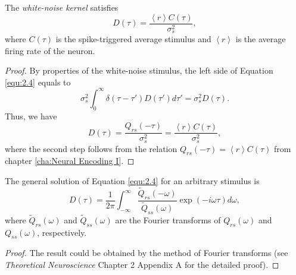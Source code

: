 \begin{prop}
  \label{prop:WhiteOptimalKernel}
  The \emph{white-noise kernel} satisfies
  \begin{equation}
    \label{equ:2.6}
    D(\tau) = \frac{\left<r\right>C(\tau)}{\sigma_s^2},
  \end{equation}
  where $C(\tau)$ is the spike-triggered average stimulus and $\left<r\right>$ is the average firing rate of the neuron.
\end{prop}
\begin{proof}
  By properties of the white-noise stimulus, the left side of Equation \ref{equ:2.4} equals to
  \begin{equation}
    \label{equ:2.5}
    \sigma_s^2\int_0^{\infty}\delta(\tau-\tau')D(\tau')d\tau' = \sigma_s^2D(\tau).
  \end{equation}
  Thus, we have
  \begin{equation}
    \label{equ:2.6}
    D(\tau) = \frac{Q_{rs}(-\tau)}{\sigma_s^2} = \frac{\left<r\right>C(\tau)}{\sigma_s^2},
  \end{equation}
  where the second step follows from the relation $Q_{rs}(-\tau) = \left<r\right>C(\tau)$ from chapter \ref{cha:Neural Encoding I}.
\end{proof}

\begin{prop}
  \label{prop:generalOptimalKernel}
  The general solution of Equation \ref{equ:2.4} for an arbitrary stimulus is
  \begin{equation}
    \label{equ:2.59}
    D(\tau) = \frac{1}{2\pi}\int_{-\infty}^{\infty}\frac{\tilde{Q}_{rs}(-\omega)}{\tilde{Q}_{ss}(\omega)}\exp\left(-i\omega\tau\right)d\omega,
  \end{equation}
  where $\tilde{Q}_{rs}(\omega)$ and $\tilde{Q}_{ss}(\omega)$ are the Fourier transforms of $Q_{rs}(\omega)$ and $Q_{ss}(\omega)$, respectively.
\end{prop}

\begin{proof}
  The result could be obtained by the method of Fourier transforms (see \emph{Theoretical Neuroscience} Chapter 2 Appendix A for the detailed proof).
\end{proof}

